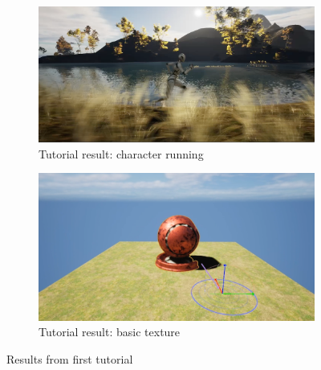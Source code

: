 \documentclass[
  a4paper,  %
  twoside,  %
  bibliography=totoc,
  headsepline,
  cleardoublepage=empty,
  parskip=half,
  draft=false
]{scrbook}
\begin{document}
\begin{figure}[h]
  \begin{subfigure}{0.45\textwidth}
    \includegraphics[width=\linewidth]{graphics/images/unreal-engine/Basics/Landscape-running.png}
    \caption{Tutorial result: character running}
  \end{subfigure}
  \begin{subfigure}{0.45\textwidth}
    \includegraphics[width=\linewidth]{graphics/images/unreal-engine/Basics/Texture.png}
    \caption{Tutorial result: basic texture}
  \end{subfigure}
  \caption{Results from first tutorial}
  \label{fig:ue-basic-tutorial}
\end{figure}
\end{document}
